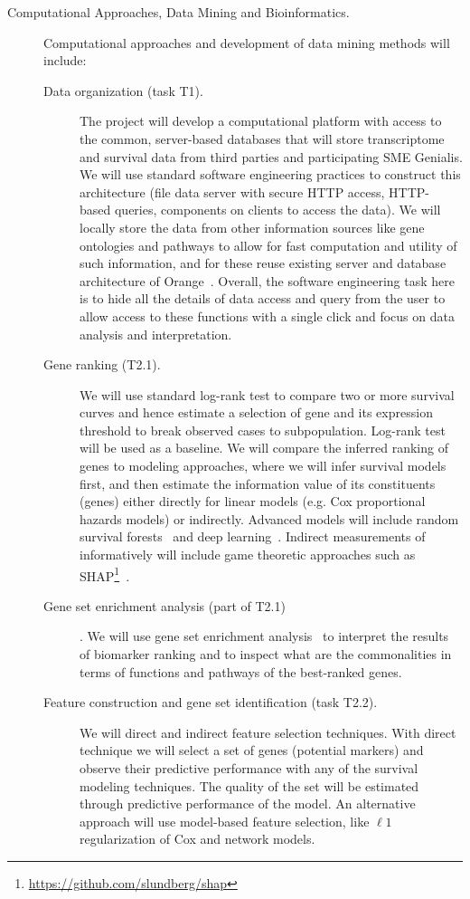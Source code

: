 \documentclass[11pt,a4paper]{article}
\newcommand{\myurl}[1]{\footnote{\url{#1}}}
\begin{document}
\begin{description}
	\item[Computational Approaches, Data Mining and Bioinformatics.] Computational approaches and development of data mining methods will include:
	\begin{description}
		\item[Data organization (task T1).] The project will develop a computational platform with access to the common, server-based databases that will store transcriptome and survival data from third parties and participating SME Genialis. We will use standard software engineering practices to construct this architecture (file data server with secure HTTP access, HTTP- based queries, components on clients to access the data). We will locally store the data from other information sources like gene ontologies and pathways to allow for fast computation and utility of such information, and for these reuse existing server and database architecture of Orange~\cite{XXX}. Overall, the software engineering task here is to hide all the details of data access and query from the user to allow access to these functions with a single click and focus on data analysis and interpretation.
		\item[Gene ranking (T2.1).] We will use standard log-rank test to compare two or more survival curves and hence estimate a selection of gene and its expression threshold to break observed cases to subpopulation. Log-rank test will be used as a baseline. We will compare the inferred ranking of genes to modeling approaches, where we will infer survival models first, and then estimate the information value of its constituents (genes) either directly for linear models (e.g. Cox proportional hazards models) or indirectly. Advanced models will include random survival forests~\cite{22088987} and deep learning~\cite{29482517,29634719}. Indirect measurements of informatively will include game theoretic approaches such as SHAP\myurl{https://github.com/slundberg/shap}~\cite{32607472}.
		\item[Gene set enrichment analysis (part of T2.1)]. We will use gene set enrichment analysis~\cite{1239896,} to interpret the results of biomarker ranking and to inspect what are the commonalities in terms of functions and pathways of the best-ranked genes.
		\item[Feature construction and gene set identification (task T2.2).] We will direct and indirect feature selection techniques. With direct technique we will select a set of genes (potential markers) and observe their predictive performance with any of the survival modeling techniques. The quality of the set will be estimated through predictive performance of the model. An alternative approach will use model-based feature selection, like $\ell 1$ regularization of Cox and network models.

\end{description}
\end{description}
\end{document}
